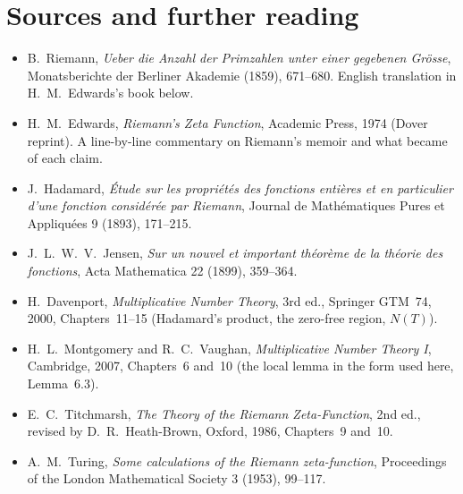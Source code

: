 \section*{Sources and further reading}

\begin{itemize}
\item B.~Riemann, \emph{Ueber die Anzahl der Primzahlen unter einer gegebenen Grösse}, Monatsberichte der Berliner Akademie (1859), 671--680. English translation in H.~M.~Edwards's book below.
\item H.~M.~Edwards, \emph{Riemann's Zeta Function}, Academic Press, 1974 (Dover reprint). A line-by-line commentary on Riemann's memoir and what became of each claim.
\item J.~Hadamard, \emph{Étude sur les propriétés des fonctions entières et en particulier d'une fonction considérée par Riemann}, Journal de Mathématiques Pures et Appliquées 9 (1893), 171--215.
\item J.~L.~W.~V.~Jensen, \emph{Sur un nouvel et important théorème de la théorie des fonctions}, Acta Mathematica 22 (1899), 359--364.
\item H.~Davenport, \emph{Multiplicative Number Theory}, 3rd ed., Springer GTM~74, 2000, Chapters~11--15 (Hadamard's product, the zero-free region, $N(T)$).
\item H.~L.~Montgomery and R.~C.~Vaughan, \emph{Multiplicative Number Theory I}, Cambridge, 2007, Chapters~6 and~10 (the local lemma in the form used here, Lemma~6.3).
\item E.~C.~Titchmarsh, \emph{The Theory of the Riemann Zeta-Function}, 2nd ed., revised by D.~R.~Heath-Brown, Oxford, 1986, Chapters~9 and~10.
\item A.~M.~Turing, \emph{Some calculations of the Riemann zeta-function}, Proceedings of the London Mathematical Society 3 (1953), 99--117.
\end{itemize}
